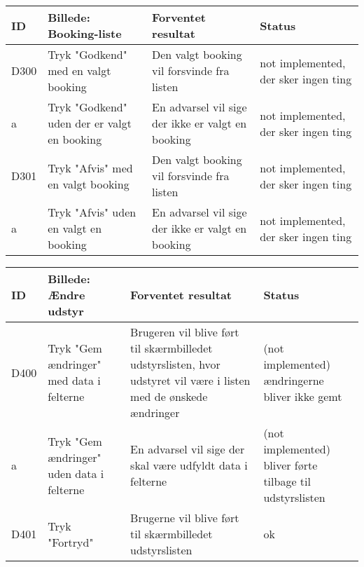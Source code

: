 \begin{tabularx}{\textwidth}{ |X|X|X|X| }
\hline
	ID & Billede: Booking-liste  & Forventet resultat & Status\\ 
\hline
	D300 & Tryk "Godkend" med en valgt booking & Den valgt booking vil forsvinde fra listen & not implemented, der sker ingen ting \\
\hline
	a & Tryk "Godkend" uden der er valgt en booking & En advarsel vil sige der ikke er valgt en booking & not implemented, der sker ingen ting \\
\hline
	D301 & Tryk "Afvis" med en valgt booking & Den valgt booking vil forsvinde fra listen & not implemented, der sker ingen ting \\
\hline
	a & Tryk "Afvis" uden en valgt en booking & En advarsel vil sige der ikke er valgt en booking & not implemented, der sker ingen ting \\
\hline
\end{tabularx}

\begin{tabularx}{\textwidth}{ |X|X|X|X| }
\hline
	ID & Billede: Ændre udstyr & Forventet resultat & Status\\ 
\hline
	D400 & Tryk "Gem ændringer" med data i felterne & Brugeren vil blive ført til skærmbilledet udstyrslisten, hvor udstyret vil være i listen med de ønskede ændringer &(not implemented) ændringerne bliver ikke gemt \\
\hline
	a & Tryk "Gem ændringer" uden data i felterne & En advarsel vil sige der skal være udfyldt data i felterne &(not implemented) bliver førte tilbage til udstyrslisten \\
\hline
	D401 & Tryk "Fortryd" & Brugerne vil blive ført til skærmbilledet udstyrslisten & ok \\
\hline
\end{tabularx}

